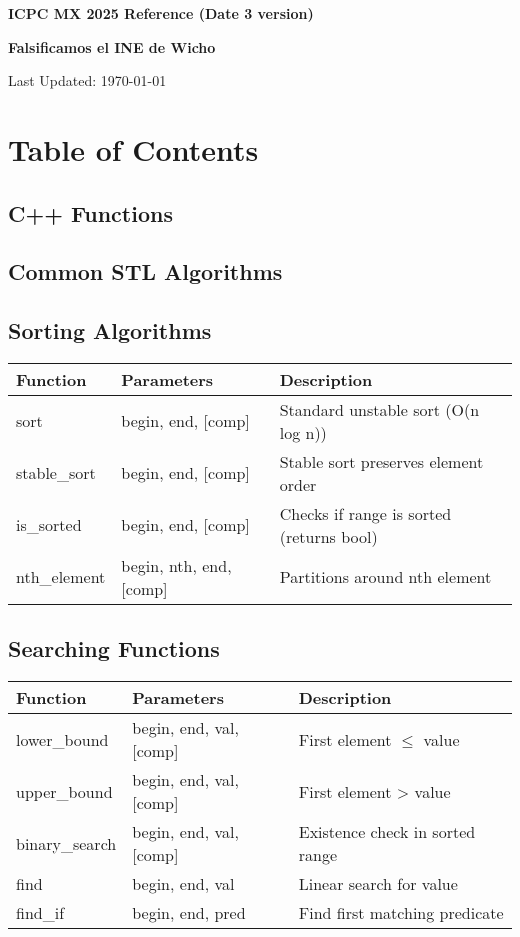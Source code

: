 \documentclass[10pt]{article}
\newcommand{\authorname}{\textbf{Falsificamos el INE de Wicho}} %
\newcommand{\maketitlepage}{
    \begin{titlepage}
        \centering
        \vspace*{2cm}
        {\Huge\bfseries ICPC MX 2025 Reference (Date 3 version)\par}
        \vspace{1cm}
        {\Large \authorname \par} %
        \vspace{2cm}
        {\large Last Updated: \today\par}
        \vfill
    \end{titlepage}
}
\begin{document}
\maketitlepage
\cleardoublepage

\section*{Table of Contents}
\begin{multicols*}{2}
    \startcontents[sections]
\end{multicols*}
\newpage

\begin{multicols*}{2}


\section{C++ Functions}
\subsection{Common STL Algorithms}

\subsection*{Sorting Algorithms}
\begin{tabularx}{\linewidth}{|l|l|X|}
    \hline
    \textbf{Function} & \textbf{Parameters} & \textbf{Description} \\
    \hline
    sort & begin, end, [comp] & Standard unstable sort (O(n log n)) \\
    \hline
    stable\_sort & begin, end, [comp] & Stable sort preserves element order \\
    \hline
    is\_sorted & begin, end, [comp] & Checks if range is sorted (returns bool) \\
    \hline
    nth\_element & begin, nth, end, [comp] & Partitions around nth element \\
    \hline
\end{tabularx}

\subsection*{Searching Functions}
\begin{tabularx}{\linewidth}{|l|l|X|}
    \hline
    \textbf{Function} & \textbf{Parameters} & \textbf{Description} \\
    \hline
    lower\_bound & begin, end, val, [comp] & First element $\leq$ value \\
    \hline
    upper\_bound & begin, end, val, [comp] & First element > value \\
    \hline
    binary\_search & begin, end, val, [comp] & Existence check in sorted range \\
    \hline
    find & begin, end, val & Linear search for value \\
    \hline
    find\_if & begin, end, pred & Find first matching predicate \\
    \hline
\end{tabularx}


\end{multicols*}
\end{document}
